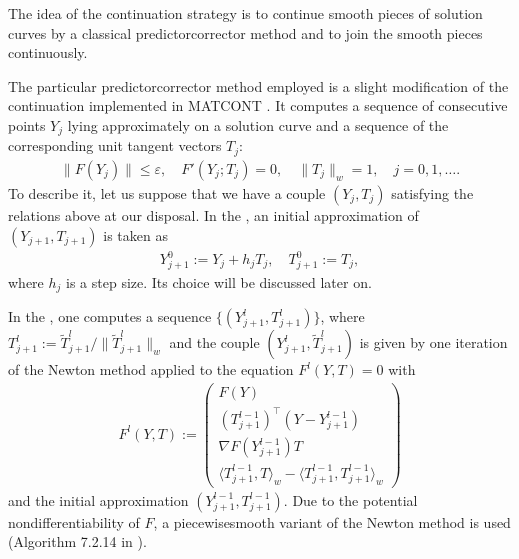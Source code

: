 \documentclass[a4paper,11pt,english]{sphinxmanual}
\begin{document}
The idea of the continuation strategy is to continue smooth pieces of solution
curves by a classical predictor\sphinxhyphen{}corrector method and to join the smooth pieces
continuously.

The particular predictor\sphinxhyphen{}corrector method employed is a slight modification of
the  continuation implemented in MATCONT .
It computes a sequence of consecutive points \(Y_{j}\) lying approximately
on a solution curve and a sequence of the corresponding unit tangent vectors
\(T_{j}\):
\begin{equation*}
\begin{split}\lVert F(Y_{j}) \rVert \leq \varepsilon,\quad F'(Y_{j}; T_{j}) = 0,\quad \lVert T_{j} \rVert_{w} = 1,\quad j = 0, 1,\dotsc.\end{split}
\end{equation*}
To describe it, let us suppose that we have a couple \((Y_{j}, T_{j})\)
satisfying the relations above at our disposal. In the , an initial
approximation of \((Y_{j+1}, T_{j+1})\) is taken as
\begin{equation*}
\begin{split}Y_{j+1}^{0} := Y_{j} + h_{j} T_{j},\quad T_{j+1}^{0} := T_{j},\end{split}
\end{equation*}
where \(h_{j}\) is a step size. Its choice will be discussed later on.

In the , one computes a sequence
\(\{(Y_{j+1}^{l}, T_{j+1}^{l})\}\), where
\(T_{j+1}^{l} := \tilde{T}_{j+1}^{l} / \lVert \tilde{T}_{j+1}^{l} \rVert_{w}\)
and the couple \((Y_{j+1}^{l}, \tilde{T}_{j+1}^{l})\) is given by one
iteration of the Newton method applied to the equation \(F^{l}(Y, T) = 0\)
with
\begin{equation*}
\begin{split}F^{l}(Y, T) := \begin{pmatrix}F(Y)\\ (T_{j+1}^{l-1})^{\top}(Y - Y_{j+1}^{l-1})\\ \nabla F(Y_{j+1}^{l-1})T\\ \langle T_{j+1}^{l-1}, T \rangle_{w} - \langle T_{j+1}^{l-1}, T_{j+1}^{l-1} \rangle_{w}\end{pmatrix}\end{split}
\end{equation*}
and the initial approximation \((Y_{j+1}^{l-1}, T_{j+1}^{l-1})\). Due to the
potential non\sphinxhyphen{}differentiability of \(F\), a piecewise\sphinxhyphen{}smooth variant of the
Newton method is used (Algorithm 7.2.14 in ).
\end{document}
